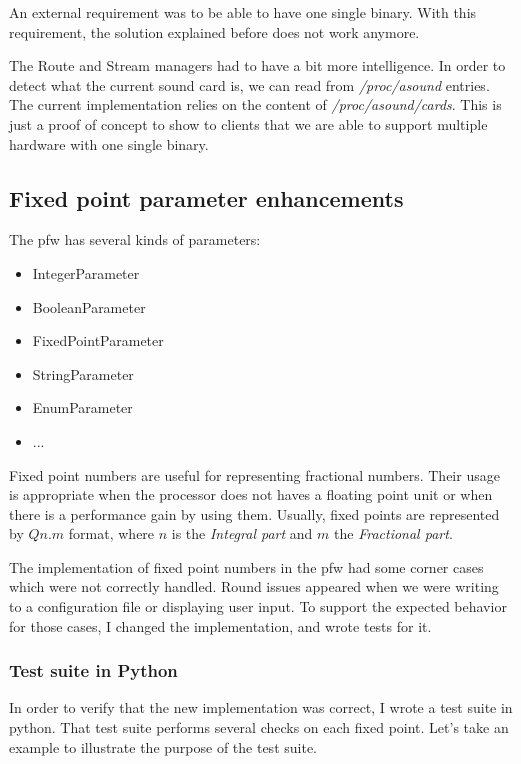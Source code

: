 An external requirement was to be able to have one single binary. With this
requirement, the solution explained before does not work anymore.

The Route and Stream managers had to have a bit more intelligence. In
order to detect what the current sound card is, we can read from \emph{/proc/asound} entries.
The current implementation relies on the content of \emph{/proc/asound/cards}.
This is just a proof of concept to show to clients that we are able to support multiple hardware
with one single binary.


\subsection{Fixed point parameter enhancements}
The \gls{pfw} has several kinds of parameters:
\begin{itemize}
    \item IntegerParameter
    \item BooleanParameter
    \item FixedPointParameter
    \item StringParameter
    \item EnumParameter
    \item ...
\end{itemize}

Fixed point numbers are useful for representing fractional numbers. Their
usage is appropriate when the processor does not haves a floating point unit
or when there is a performance gain by using them. Usually, fixed points are
represented by $Qn.m$ format, where $n$ is the \emph{Integral part} and $m$ the
\emph{Fractional part}.

The implementation of fixed point numbers in the \gls{pfw} had some
corner cases which were not correctly handled. Round issues appeared when we
were writing to a configuration file or displaying user input. To
support the expected behavior for those cases, I changed the implementation, and
wrote tests for it.

\subsubsection{Test suite in Python}

In order to verify that the new implementation was correct, I wrote a test suite
in \gls{python}. That test suite performs several checks on each fixed point. Let's
take an example to illustrate the purpose of the test suite.

